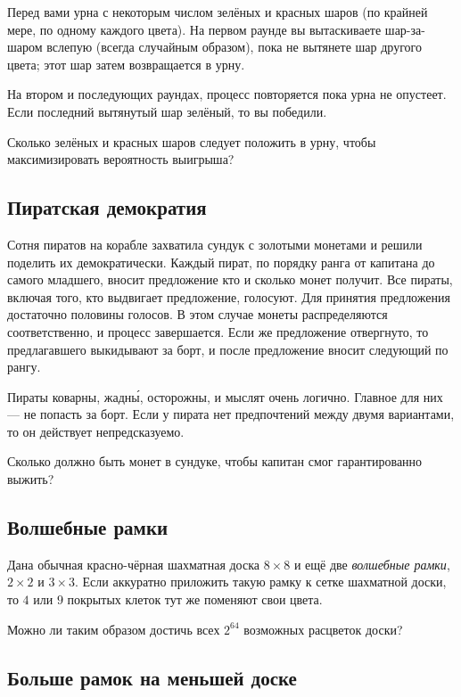 Перед вами урна с некоторым числом зелёных и красных шаров (по крайней мере, по одному каждого цвета).
На первом раунде вы вытаскиваете шар-за-шаром вслепую (всегда случайным образом), пока не вытянете шар другого цвета; этот шар затем возвращается в урну.

На втором и последующих раундах, процесс повторяется пока урна не опустеет.
Если последний вытянутый шар зелёный, то вы победили.

Сколько зелёных и красных шаров следует положить в урну, чтобы максимизировать вероятность выигрыша?

\subsection*{Пиратская демократия}

Сотня пиратов на корабле захватила сундук с золотыми монетами и решили поделить их демократически.
Каждый пират, по порядку ранга от капитана до самого младшего, вносит предложение кто и сколько монет получит.
Все пираты, включая того, кто выдвигает предложение, голосуют.
Для принятия предложения достаточно половины голосов.
В этом случае монеты распределяются соответственно, и процесс завершается.
Если же предложение отвергнуто, то предлагавшего выкидывают за борт, и после предложение вносит следующий по рангу.

Пираты коварны, жадн\'{ы}, осторожны, и мыслят очень логично.
Главное для них --- не попасть за борт.
Если у пирата нет предпочтений между двумя вариантами, то он действует непредсказуемо.

Сколько должно быть монет в сундуке, чтобы капитан смог гарантированно выжить?

\subsection*{Волшебные рамки}

Дана обычная красно-чёрная шахматная доска $8 \times 8$ и ещё две \emph{волшебные рамки},  $2 \times 2$ и $3 \times 3$.
Если аккуратно приложить такую рамку к сетке шахматной доски, то $4$ или $9$ покрытых клеток тут же поменяют свои цвета.

Можно ли таким образом достичь всех $2^{64}$ возможных расцветок доски?

\subsection*{Больше рамок на меньшей доске}

